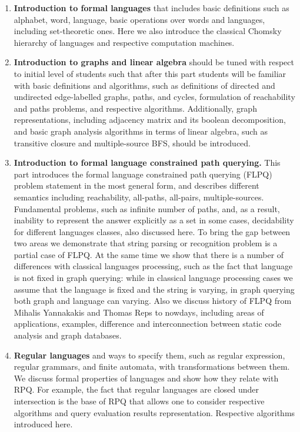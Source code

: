 \documentclass[sigconf]{acmart}
\begin{document}
\begin{enumerate}
  \item \label{fl_intro} \textbf{Introduction to formal languages} that includes basic definitions such as alphabet, word, language, basic operations over words and languages, including set-theoretic ones. 
  Here we also introduce the classical Chomsky hierarchy of languages and respective computation machines.
  
  \item \label{graphs_intro} \textbf{Introduction to graphs and linear algebra} should be tuned with respect to initial level of students such that after this part students will be familiar with basic definitions and algorithms, such as definitions of directed and undirected edge-labelled graphs, paths, and cycles, formulation of reachability and paths problems, and respective algorithms. 
  Additionally, graph representations, including adjacency matrix and its boolean decomposition, and basic graph analysis algorithms in terms of linear algebra, such as transitive closure and multiple-source BFS, should be introduced.
  
  \item \label{flpq_intro} \textbf{Introduction to formal language constrained path querying.} 
  This part introduces the formal language constrained path querying (FLPQ)~\cite{doi:10.1137/S0097539798337716} problem statement in the most general form, and describes different semantics including reachability, all-paths, all-pairs, multiple-sources. 
  Fundamental problems, such as infinite number of paths, and, as a result, inability to represent the answer explicitly as a set in some cases, decidability for different languages classes, also discussed here. 
  To bring the gap between two areas we demonstrate that string parsing or recognition problem is a partial case of FLPQ. 
  At the same time we show that there is a number of differences with classical languages processing, such as the fact that language is not fixed in graph querying: while in classical language processing cases we assume that the language is fixed and the string is varying, in graph querying both graph and language can varying.
  Also we discuss history of FLPQ from Mihalis Yannakakis and Thomas Reps to nowdays, including areas of applications, examples, difference and interconnection between static code analysis and graph databases.

  \item \label{regular_languages_intro} \textbf{Regular languages} and ways to specify them, such as regular expression, regular grammars, and finite automata, with transformations between them. 
  We discuss formal properties of languages and show how they relate with RPQ.
  For example, the fact that regular languages are closed under intersection is the base of RPQ that allows one to consider respective algorithms and query evaluation results representation.
  Respective algorithms introduced here.
  

\end{enumerate}
\end{document}
